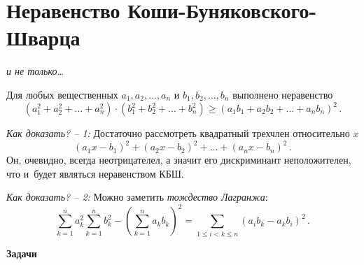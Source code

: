 
\section*{Неравенство Коши-Буняковского-Шварца}

\vspace{-1ex}
\emph{и не только\ldots}
\vspace{1ex}

Для любых вещественных $a_1, a_2, \ldots, a_n$ и $b_1, b_2, \ldots, b_n$
выполнено неравенство
\[
    (a_1^2 + a_2^2 + \ldots + a_n^2)
    \cdot
    (b_1^2 + b_2^2 + \ldots + b_n^2)
\geq
    (a_1 b_1 + a_2 b_2 + \ldots + a_n b_n)^2
\,.\]

\emph{Как доказать? -- 1:}
Достаточно рассмотреть квадратный трехчлен относительно $x$
\[
    (a_1 x - b_1)^2 + (a_2 x - b_2)^2 + \ldots + (a_n x - b_n)^2
\,.\]
Он, очевидно, всегда неотрицателел, а значит его дискриминант неположителен,
что и~будет являться неравенством КБШ. 

\emph{Как доказать? -- 2:}
Можно заметить \emph{тождество Лагранжа}:
\[
    \sum_{k=1}^{n}
        a_k^2
    \sum_{k=1}^{n}
        b_k^2
    -
    \left(
        \sum_{k=1}^{n}
            a_k b_k
    \right)^2
=
    \sum_{1 \leq i < k \leq n}
        (a_i b_k - a_k b_i)^2
\,.\]

\textbf{Задачи}

